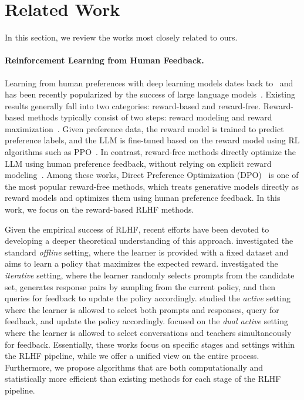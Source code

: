 \section{Related Work}
\label{sec:related_work}

In this section, we review the works most closely related to ours.

\paragraph{Reinforcement Learning from Human Feedback.} Learning from human preferences with deep learning models dates back to~\citet{NIPS'17:RLHF} and has been recently popularized by the success of large language models~\citep{arXiv'22:Bai-RLHF, arXiv'23:llama-2, arXiv'23:GPT-4}. Existing results generally fall into two categories: reward-based and reward-free. Reward-based methods typically consist of two steps: reward modeling and reward maximization~\citep{NeurIPS'22:Ouyang-InstructGPT}. Given preference data, the reward model is trained to predict preference labels, and the LLM is fine-tuned based on the reward model using RL algorithms such as PPO~\citep{arXiv'17:PPO}. In contrast, reward-free methods directly optimize the LLM using human preference feedback, without relying on explicit reward modeling~\citep{NeurIPS'23:DPO, AISTATS'24:Azar-IPO}. Among these works, Direct Preference Optimization (DPO)~\citep{NeurIPS'23:DPO} is one of the most popular reward-free methods, which treats generative models directly as reward models and optimizes them using human preference feedback. In this work, we focus on the reward-based RLHF methods.

Given the empirical success of RLHF, recent efforts have been devoted to developing a deeper theoretical understanding of this approach. \citet{ICML'23:Zhu-Principled} investigated the standard \emph{offline} setting, where the learner is provided with a fixed dataset and aims to learn a policy that maximizes the expected reward. \citet{ICML'24:Xiong-Iterative} investigated the \emph{iterative} setting, where the learner randomly selects prompts from the candidate set, generates response pairs by sampling from the current policy, and then queries for feedback to update the policy accordingly. \citet{arXiv'24:Das-RLHF-active} studied the \emph{active} setting where the learner is allowed to select both prompts and responses, query for feedback, and update the policy accordingly. \citet{arXiv'25:Liu-Dual-active} focused on the \emph{dual active} setting where the learner is allowed to select conversations and teachers simultaneously for feedback. Essentially, these works focus on specific stages and settings within the RLHF pipeline, while we offer a unified view on the entire process. Furthermore, we propose algorithms that are both computationally and statistically more efficient than existing methods for each stage of the RLHF pipeline.


